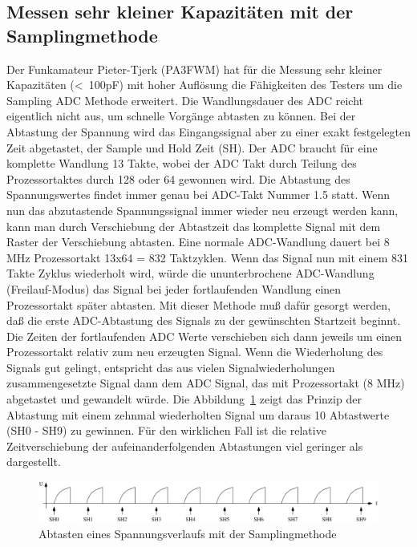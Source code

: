 \subsection{Messen sehr kleiner Kapazitäten mit der Samplingmethode}
Der Funkamateur Pieter-Tjerk (PA3FWM) hat für die Messung sehr kleiner Kapazitäten (\textless~100pF) mit hoher Auflösung
die Fähigkeiten des Testers um die Sampling ADC Methode erweitert.
Die Wandlungsdauer des ADC reicht eigentlich nicht aus, um schnelle Vorgänge abtasten zu können.
Bei der Abtastung der Spannung wird das Eingangssignal aber zu einer exakt festgelegten Zeit abgetastet,
der Sample und Hold Zeit (SH). Der ADC braucht für eine komplette Wandlung 13 Takte, wobei der
ADC Takt durch Teilung des Prozessortaktes durch 128 oder 64 gewonnen wird.
Die Abtastung des Spannungswertes findet immer genau bei ADC-Takt Nummer 1.5 statt. 
Wenn nun das abzutastende Spannungssignal immer wieder neu erzeugt werden kann,
kann man durch Verschiebung der Abtastzeit das komplette Signal mit dem Raster der Verschiebung abtasten.
Eine normale ADC-Wandlung dauert bei 8 MHz Prozessortakt 13x64 = 832 Taktzyklen. 
Wenn das Signal nun mit einem 831 Takte Zyklus wiederholt wird, würde die ununterbrochene ADC-Wandlung (Freilauf-Modus)
das Signal bei jeder fortlaufenden Wandlung einen Prozessortakt später abtasten.
Mit dieser Methode muß dafür gesorgt werden, daß die erste ADC-Abtastung des Signals zu der
gewünschten Startzeit beginnt. Die Zeiten der fortlaufenden ADC Werte verschieben sich dann jeweils um einen
Prozessortakt relativ zum neu erzeugten Signal. Wenn die Wiederholung des Signals gut gelingt, entspricht 
das aus vielen Signalwiederholungen zusammengesetzte Signal dann dem ADC Signal, das mit Prozessortakt (8 MHz) 
abgetastet und gewandelt würde.
Die Abbildung~\ref{fig:sampling} zeigt das Prinzip der Abtastung mit einem zehnmal wiederholten Signal
um daraus 10 Abtastwerte (SH0 - SH9) zu gewinnen.
Für den wirklichen Fall ist die relative Zeitverschiebung der aufeinanderfolgenden Abtastungen 
viel geringer als dargestellt.

\begin{figure}[H]
\centering
\includegraphics[width=18cm]{../FIG/sampling.pdf}
\caption{Abtasten eines Spannungsverlaufs mit der Samplingmethode}
\label{fig:sampling}
\end{figure}

